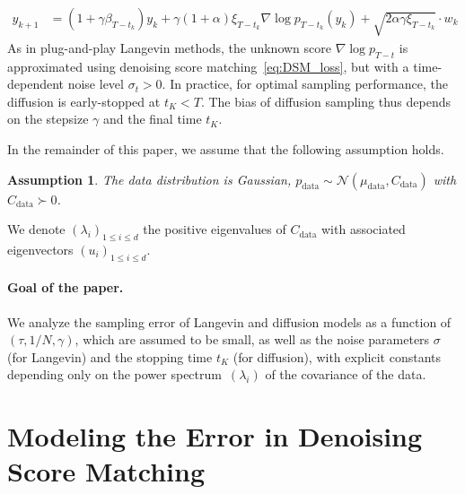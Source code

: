 \documentclass[11pt]{article}
\newtheorem{ass}{Assumption}
\newcommand{\id}{\operatorname{Id}}
\begin{document}
\begin{align} \label{eq:euler_disc}
        y_{k+1} &= (1 + \gamma \beta_{T-t_k}) y_k + \gamma (1 + \alpha) \xi_{T-t_k} \nabla \log p_{T-t_k}(y_k) + \sqrt{2 \alpha \gamma \xi_{T-t_k}} \cdot w_k
\end{align}
As in plug-and-play Langevin methods, the unknown score \( \nabla \log p_{T-t} \) is approximated using denoising score matching~\eqref{eq:DSM_loss}, but with a time-dependent noise level \( \sigma_t > 0 \). In practice, for optimal sampling performance, the diffusion is early-stopped at $t_K < T$. The bias of diffusion sampling thus depends on the stepsize $\gamma$ and the final time $t_K$.

In the remainder of this paper, we assume that the following assumption holds.
\begin{ass}\label{ass:gaussian} The data distribution is Gaussian, $p_{\mathrm{data}} \sim \mathcal{N}(\mu_\mathrm{data}, C_\mathrm{data})$ with $C_\mathrm{data} \succ  0$. 
\end{ass}
We denote $(\lambda_i)_{1 \leq i \leq d}$ the positive eigenvalues of $C_\mathrm{data}$ with associated eigenvectors $(u_i)_{1 \leq i \leq d}$.
%

\paragraph{Goal of the paper.} We analyze the sampling error of Langevin and diffusion models as a function of 
\((\tau, 1/N, \gamma)\), which are assumed to be small, as well as the noise parameters \(\sigma\) (for Langevin) and the stopping time \(t_K\) (for diffusion), with explicit constants depending only on the power spectrum~$(\lambda_i)$ of the covariance of the data.

\section{Modeling the Error in Denoising Score Matching} \label{sec:DSM_error}
\end{document}
